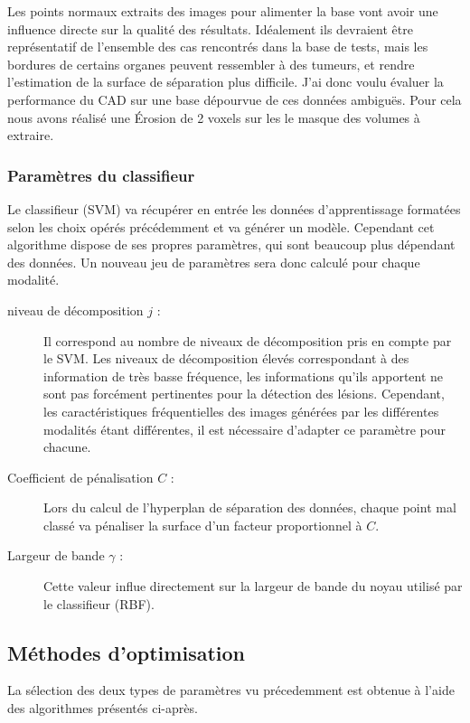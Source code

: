 Les points normaux extraits des images pour alimenter la base vont avoir une influence directe sur la qualité des résultats. Idéalement ils devraient être représentatif de l'ensemble des cas rencontrés dans la base de tests, mais les bordures de certains organes peuvent ressembler à des tumeurs, et rendre l'estimation de la surface de séparation plus difficile. J'ai donc voulu évaluer la performance du CAD sur une base dépourvue de ces données ambiguës. Pour cela nous avons réalisé une Érosion de 2 voxels sur les le masque des volumes à extraire.

\subsubsection{Paramètres du classifieur}

Le classifieur (SVM) va récupérer en entrée les données d'apprentissage formatées selon les choix opérés précédemment et va générer un modèle. Cependant cet algorithme dispose de ses propres paramètres, qui sont beaucoup plus dépendant des données. Un nouveau jeu de paramètres sera donc calculé pour chaque modalité.

\begin{description}
 \item[niveau de décomposition $j$ :] Il correspond au nombre de niveaux de décomposition pris en compte par le SVM. Les niveaux de décomposition élevés correspondant à des information de très basse fréquence, les informations qu'ils apportent ne sont pas forcément pertinentes pour la détection des lésions. Cependant, les caractéristiques fréquentielles des images générées par les différentes modalités étant différentes, il est nécessaire d'adapter ce paramètre pour chacune.
 \item[Coefficient de pénalisation $C$ :] Lors du calcul de l'hyperplan de séparation des données, chaque point mal classé va pénaliser la surface d'un facteur proportionnel à $C$.
 \item[Largeur de bande $\gamma$ :] Cette valeur influe directement sur la largeur de bande du noyau utilisé par le classifieur (RBF).
\end{description}

\subsection{Méthodes d'optimisation}

La sélection des deux types de paramètres vu précedemment est obtenue à l'aide des algorithmes présentés ci-après. 

